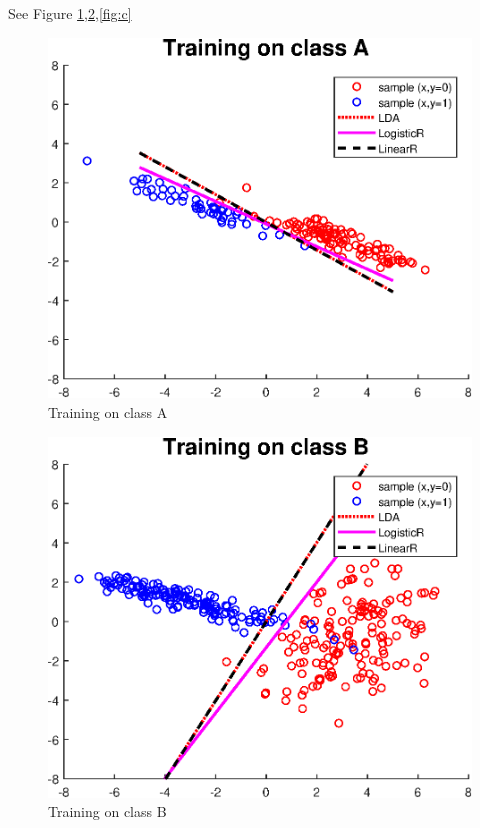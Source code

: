 \documentclass{article}
\begin{document}
	
	See Figure \ref{fig:a},\ref{fig:b},\ref{fig:c}
	\begin{figure}
		\centering
		\includegraphics[scale=0.6]{plot_a.eps}
		\caption{Training on class A}
		\label{fig:a}
	\end{figure}
	\begin{figure}
		\centering
		\includegraphics[scale=0.6]{plot_b.eps}
		\caption{Training on class B}
		\label{fig:b}
	\end{figure}
\end{document}
